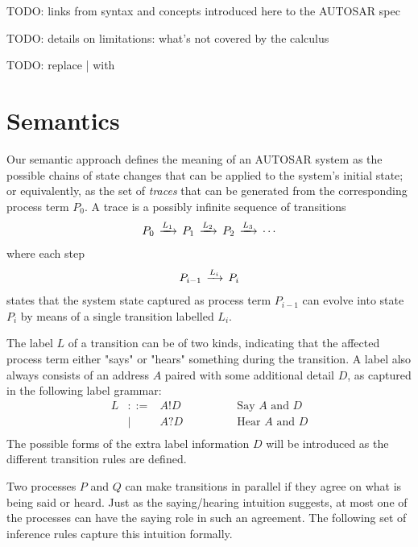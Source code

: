 \documentclass[twocolumn]{article}
\begin{document}
TODO: links from syntax and concepts introduced here to the AUTOSAR spec

TODO: details on limitations: what's not covered by the calculus

TODO: replace | with \Opar

\section{Semantics}
\label{sec:Sem}

Our semantic approach defines the meaning of an AUTOSAR system as the possible chains of state changes that can be applied to the system's initial state; or equivalently, as the set of \emph{traces} that can be generated from the corresponding process term $P_0$. A trace is a possibly infinite sequence of transitions
\[
\begin{array}{c}
  P_0 \,\xrightarrow{L_1}\, P_1 \,\xrightarrow{L_2}\, P_2 \,\xrightarrow{L_3}\, \cdots
\end{array}
\]
where each step
\[
\begin{array}{c}
  P_{i-1} \,\xrightarrow{L_i}\, P_i
\end{array}
\]
states that the system state captured as process term $P_{i-1}$ can evolve into state $P_i$ by means of a single transition labelled $L_i$.


The label $L$ of a transition can be of two kinds, indicating that the affected process term either "says" or "hears" something during the transition. A label also always consists of an address $A$ paired with some additional detail $D$, as captured in the following label grammar:
\[
\begin{array}{rcll}
  L     & ::= & A!D & \hspace{4em}\text{Say  $A$ and $D$} \\
        & |   & A?D & \hspace{4em}\text{Hear $A$ and $D$} \\
\end{array}
\]
The possible forms of the extra label information $D$ will be introduced as the different transition rules are defined.

Two processes $P$ and $Q$ can make transitions in parallel if they agree on what is being said or heard. Just as the saying/hearing intuition suggests, at most one of the processes can have the saying role in such an agreement. The following set of inference rules capture this intuition formally.
\end{document}
